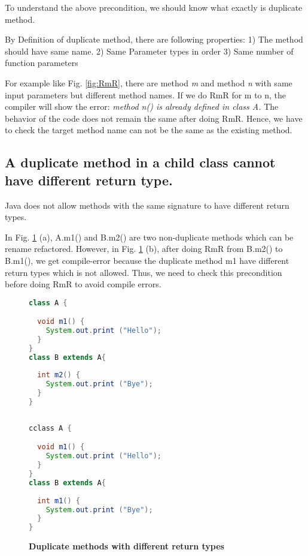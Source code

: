 To understand the above precondition, we should know what exactly is duplicate method.

By Definition of duplicate method, there are following properties:
1) The method should have same name.
2) Same Parameter types in order
3) Same number of function parameters

For example like Fig. \ref{fig:RmR}, there are method \textsl{m} and method \textsl{n} with same input parameters but different method names. If we do RmR for m to n, the compiler will show the error: \textsl{method n() is already defined in class A.} The behavior of the code does not remain the same after doing RmR. Hence, we have to check the target method name can not be the same as the existing method.

\subsection{A duplicate method in a child class cannot have different return type.}

Java does not allow methods with the same signature to have different return types.

In Fig. \ref{fig:RmR2} (a), A.m1() and B.m2() are two non-duplicate methods which can be rename refactored. However, in Fig. \ref{fig:RmR2} (b), after doing RmR from B.m2() to B.m1(), we get compile-error because the duplicate method m1 have different return types which is not allowed. Thus, we need to check this precondition before doing RmR to avoid compile errors.

\begin{figure}[th]
\centering
\begin{minipage}[t]{0.7\linewidth}
\begin{lstlisting}[language=java, basicstyle=\scriptsize\ttfamily,frame=single]
class A {

  void m1() {
    System.out.print ("Hello");
  }
}
class B extends A{
 
  int m2() {
    System.out.print ("Bye");
  }	
}
 
\end{lstlisting}
\end{minipage}
\hfill
\begin{minipage}[t]{0.7\linewidth}
\begin{lstlisting}[language=java, basicstyle=\scriptsize\ttfamily,frame=single]
cclass A {

  void m1() {
    System.out.print ("Hello");
  }
}
class B extends A{
 
  int m1() {
    System.out.print ("Bye");
  }	
}

\end{lstlisting}
\end{minipage}
\caption{\textbf{Duplicate methods with different return types}}
\label{fig:RmR2}
\end{figure}

